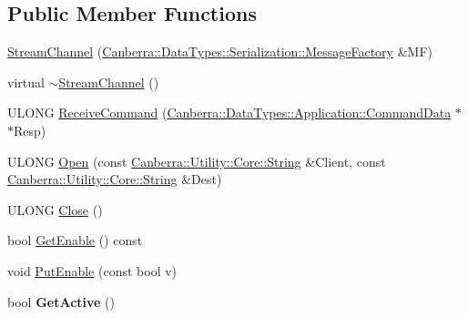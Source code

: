 \subsection*{Public Member Functions}
\begin{DoxyCompactItemize}
\item 
\hyperlink{class_canberra_1_1_protocols_1_1_lynx_1_1_stream_channel_a4e9856b9d971d348685ecb99a4abf18f_a4e9856b9d971d348685ecb99a4abf18f}{Stream\+Channel} (\hyperlink{class_canberra_1_1_data_types_1_1_serialization_1_1_message_factory}{Canberra\+::\+Data\+Types\+::\+Serialization\+::\+Message\+Factory} \&MF)
\item 
virtual \hyperlink{class_canberra_1_1_protocols_1_1_lynx_1_1_stream_channel_a67d945e9fdd144393c5b0a5916ab7c91_a67d945e9fdd144393c5b0a5916ab7c91}{$\sim$\+Stream\+Channel} ()
\item 
U\+L\+O\+NG \hyperlink{class_canberra_1_1_protocols_1_1_lynx_1_1_stream_channel_a629b6f9979646a09818c66aff827361d_a629b6f9979646a09818c66aff827361d}{Receive\+Command} (\hyperlink{class_canberra_1_1_data_types_1_1_application_1_1_command_data}{Canberra\+::\+Data\+Types\+::\+Application\+::\+Command\+Data} $\ast$$\ast$Resp)
\item 
U\+L\+O\+NG \hyperlink{class_canberra_1_1_protocols_1_1_lynx_1_1_stream_channel_a7b4e6b0164c4a5f1a480b02d1464fa3d_a7b4e6b0164c4a5f1a480b02d1464fa3d}{Open} (const \hyperlink{class_canberra_1_1_utility_1_1_core_1_1_string}{Canberra\+::\+Utility\+::\+Core\+::\+String} \&Client, const \hyperlink{class_canberra_1_1_utility_1_1_core_1_1_string}{Canberra\+::\+Utility\+::\+Core\+::\+String} \&Dest)
\item 
U\+L\+O\+NG \hyperlink{class_canberra_1_1_protocols_1_1_lynx_1_1_stream_channel_ae17c78aeb2b818dde70190333800101c_ae17c78aeb2b818dde70190333800101c}{Close} ()
\item 
bool \hyperlink{class_canberra_1_1_protocols_1_1_lynx_1_1_stream_channel_a1fbff1210a7b805bd5f53a43cb96ed76_a1fbff1210a7b805bd5f53a43cb96ed76}{Get\+Enable} () const
\item 
void \hyperlink{class_canberra_1_1_protocols_1_1_lynx_1_1_stream_channel_a25463e9739805a93b457c17874743de8_a25463e9739805a93b457c17874743de8}{Put\+Enable} (const bool v)
\item 
\mbox{\label{class_canberra_1_1_protocols_1_1_lynx_1_1_stream_channel_a65c28476884189dff9b42f367a509b67}} 
bool {\bfseries Get\+Active} ()
\item 
$$
\end{DoxyCompactItemize}

